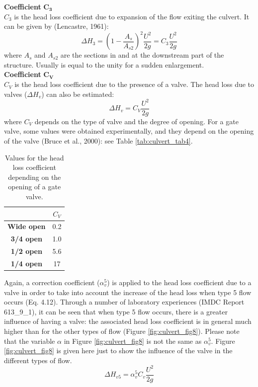 \textbf{Coefficient} $\mathbf{C_3}$\\
$C_3$ is the head loss coefficient due to expansion of the flow exiting the culvert.
It can be given by (Lencastre, 1961):
\begin{equation}
\Delta H_3 = \left(1-\dfrac{A_s}{A_{s2}}\right)^2 \dfrac{U^2}{2g} = C_3\dfrac{U^2}{2g}
\end{equation}
where $A_s$ and $A_{s2}$ are the sections in and at the downstream part of the structure.
Usually is equal to the unity for a sudden enlargement.\\

\textbf{Coefficient} $\mathbf{C_V}$\\
$C_V$ is the head loss coefficient due to the presence of a valve.
The head loss due to valves ($\Delta H_v$) can also be estimated:
\begin{equation}
\Delta H_v = C_V\dfrac{U^2}{2g}
\end{equation}
where $C_V$ depends on the type of valve and the degree of opening.
For a gate valve, some values were obtained experimentally,
and they depend on the opening of the valve (Bruce et al., 2000):
see Table \ref{tab:culvert_tab4}.
\begin{table}[H]
\caption{Values for the head loss coefficient depending on the opening of a gate valve.}
\label{tab:culvert_tab3}
\begin{center}\begin{tabular}{|c|c|}
\hline
~ & $C_V$ \\
\hline
\textbf{Wide open} & 0.2\\
\hline
\textbf{3/4 open} & 1.0 \\
\hline
\textbf{1/2 open} & 5.6 \\
\hline
\textbf{1/4 open} & 17 \\
\hline
\end{tabular}\end{center}
\end{table}

Again, a correction coefficient ($\alpha_v^5$) is applied to the head loss coefficient
due to a valve in order to take into account the increase of the head loss when type 5
flow occurs (Eq. 4.12).
Through a number of laboratory experiences (IMDC Report 613\_9\_1), it can be seen that when
type 5 flow occurs, there is a greater influence of having a valve:
the associated head loss coefficient is in general much higher than for the other types of
flow (Figure  \ref{fig:culvert_fig8}).
Please note that the variable $\alpha$ in Figure \ref{fig:culvert_fig8}
is not the same as $\alpha_v^5$.
Figure \ref{fig:culvert_fig8} is given here just to show the influence of
the valve in the different types of flow.
\begin{equation}
\Delta H_{v5} = \alpha_v^5 C_v \dfrac{U^2}{2g}
\end{equation}

